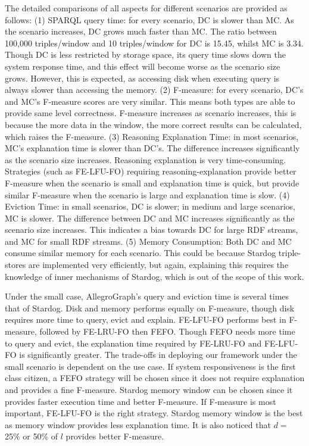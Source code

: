 The detailed comparisons of all aspects for different scenarios are provided as follows:
(1) SPARQL query time: for every scenario, DC is slower than MC. 
As the scenario increases, DC grows much faster than MC. 
The ratio between 100,000 triples/window and 10 triples/window for DC is 15.45, whilst MC is 3.34. 
Though DC is less restricted by storage space, its query time slows down the system response time, and this effect will become worse as the scenario size grows.
However, this is expected, as accessing disk when executing query is always slower than accessing the memory.     
(2) F-measure: for every scenario, DC's and MC's F-measure scores are very similar. 
This means both types are able to provide same level correctness.
F-measure increases as scenario increases, this is because the more data in the window, the more correct results can be calculated, which raises the F-measure.	
(3) Reasoning Explanation Time: in most scenarios, MC's explanation time is slower than DC's. 
The difference increases significantly as the scenario size increases.
Reasoning explanation is very time-consuming. 
Strategies (such as FE-LFU-FO) requiring reasoning-explanation provide better F-measure when the scenario is small and explanation time is quick, but provide similar F-measure when the scenario is large and explanation time is slow.	
(4) Eviction Time: in small scenarios, DC is slower; in medium and large scenarios, MC is slower.
The difference between DC and MC increases significantly as the scenario size increases. 
This indicates a bias towards DC for large RDF streams, and MC for small RDF streams.	
(5) Memory Consumption: Both DC and MC consume similar memory for each scenario. 
This could be because Stardog triple-stores are implemented very efficiently, but again, explaining this requires the knowledge of inner mechanisms of Stardog, which is out of the scope of this work. 

Under the small case, AllegroGraph's query and eviction time is several times that of Stardog. 
Disk and memory performs equally on F-measure, though disk requires more time to query, evict and explain. 
FE-LFU-FO performs best in F-measure, followed by FE-LRU-FO then FEFO. 
Though FEFO needs more time to query and evict, the explanation time required by FE-LRU-FO and FE-LFU-FO is significantly greater. 
The trade-offs in deploying our framework under the small scenario is dependent on the use case. 
If system responsiveness is the first class citizen, a FEFO strategy will be chosen since it does not require explanation and provides a fine F-measure. 
Stardog memory window can be chosen since it provides faster execution time and better F-measure. 
If F-measure is most important, FE-LFU-FO is the right strategy.
Stardog memory window is the best as memory window provides less explanation time. 
It is also noticed that $d = $ 25\% or 50\% of $l$ provides better F-measure.

